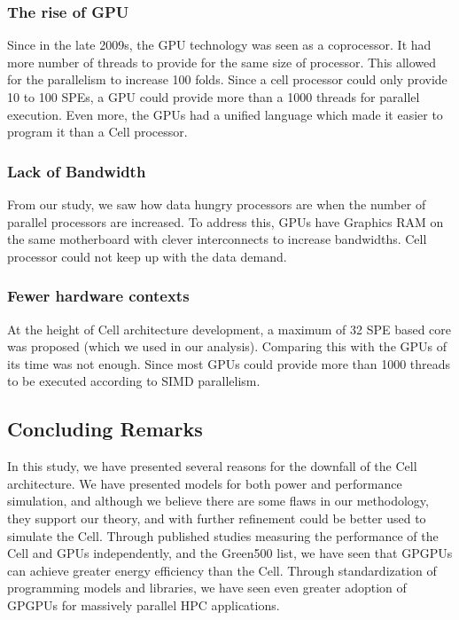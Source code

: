 \documentclass{sig-alternate-05-2015}
\begin{document}
\subsubsection{The rise of GPU}

Since in the late 2009s, the GPU technology was seen as a coprocessor. It had more number of threads to provide for the same size of processor. This allowed for the parallelism to increase 100 folds. Since a cell processor could only provide 10 to 100 SPEs, a GPU could provide more than a 1000 threads for parallel execution. Even more, the GPUs had a unified language which made it easier to program it than a Cell processor.

\subsubsection{Lack of Bandwidth}

From our study, we saw how data hungry processors are when the number of parallel processors are increased. To address this, GPUs have Graphics RAM on the same motherboard with clever interconnects to increase bandwidths. Cell processor could not keep up with the data demand. 

\subsubsection{Fewer hardware contexts}

At the height of Cell architecture development, a maximum of 32 SPE based core was proposed (which we used in our analysis). Comparing this with the GPUs of its time was not enough. Since most GPUs could provide more than 1000 threads to be executed according to SIMD parallelism.

\subsection{Concluding Remarks}

In this study, we have presented several reasons for the downfall of the Cell architecture. We have presented models for both power and performance simulation, and although we believe there are some flaws in our methodology, they support our theory, and with further refinement could be better used to simulate the Cell. Through published studies measuring the performance of the Cell and GPUs independently, and the Green500 list, we have seen that GPGPUs can achieve greater energy efficiency than the Cell. Through standardization of programming models and libraries, we have seen even greater adoption of GPGPUs for massively parallel HPC applications.
\end{document}
